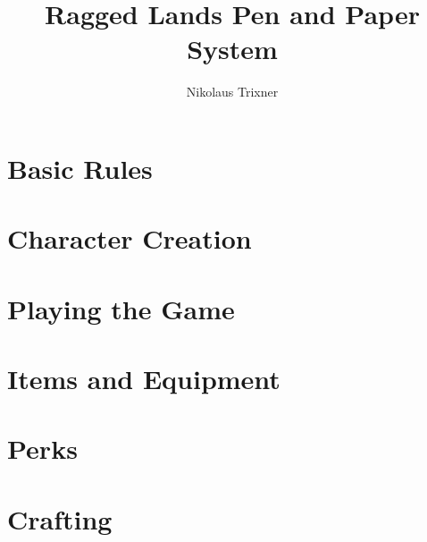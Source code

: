 \documentclass{report}
\begin{document}
	\title{Ragged Lands Pen and Paper System}
	\author{Nikolaus Trixner}
		
	\maketitle
	
	\tableofcontents

%	
%	

\part{Basic Rules}
	
\newpage

\part{Character Creation}
	
	
	
%	
%	
\newpage

\part{Playing the Game}
	
	
	
	
\newpage

\part{Items and Equipment}
	
	
	
\newpage

\part{Perks}
	
	
	
	
	
	
\newpage

\part{Crafting}
	
	\newpage
	
\end{document}
